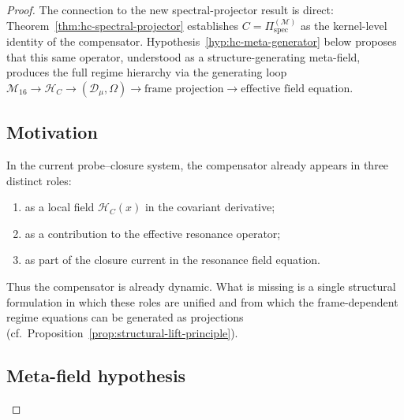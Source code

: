 \begin{proof}
The connection to the new spectral-projector result is direct:
Theorem~\ref{thm:hc-spectral-projector} establishes
$C = \Pi^{(\mathcal{M})}_{\mathrm{spec}}$ as the kernel-level identity
of the compensator. Hypothesis~\ref{hyp:hc-meta-generator} below
proposes that this same operator, understood as a structure-generating
meta-field, produces the full regime hierarchy via the generating loop
$\mathcal{M}_{16} \to \mathcal{H}_C \to (\mathcal{D}_\mu,\Omega) \to
\text{frame projection} \to \text{effective field equation}$.

\subsection*{Motivation}

In the current probe--closure system, the compensator already appears
in three distinct roles:
\begin{enumerate}[label=(\arabic*)]
  \item as a local field $\mathcal{H}_C(x)$ in the covariant derivative;
  \item as a contribution to the effective resonance operator;
  \item as part of the closure current in the resonance field equation.
\end{enumerate}
Thus the compensator is already dynamic. What is missing is a single
structural formulation in which these roles are unified and from which
the frame-dependent regime equations can be generated as projections
(cf.\ Proposition~\ref{prop:structural-lift-principle}).

\subsection*{Meta-field hypothesis}


\end{proof}
